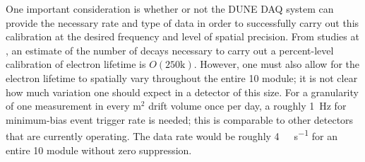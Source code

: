 
One important consideration is whether or not the DUNE \fardet DAQ system can provide the necessary rate and type of data in order to successfully carry out this calibration at the desired frequency and level of spatial precision. From studies at \microboone, an estimate of the number of decays necessary to carry out a percent-level calibration of electron lifetime is $O(\mathrm{250k})$. 
However, one must also allow for the electron lifetime to spatially vary throughout the entire \SI{10}{\kt} module; it is not clear how much variation one should expect in a detector of this size. For a granularity of one measurement in every $\mathrm{m}^{2}$ drift volume once per day, a roughly 1~Hz for minimum-bias event trigger rate is needed; this is comparable to other \lartpc detectors that are currently operating. The data rate would be roughly \SI{4}{\giga\byte\per\s} for an entire \SI{10}{\kt} module without zero suppression. 

